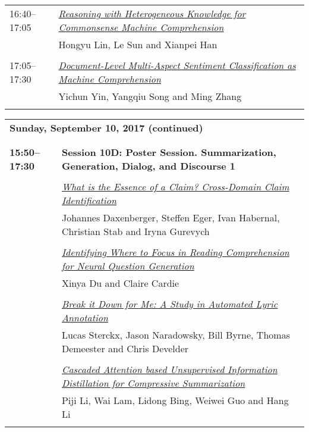 \begin{tabular}{p{20mm}p{128mm}}
16:40--17:05 & \hyperlink{page.2021}{\em Reasoning with Heterogeneous Knowledge for Commonsense Machine Comprehension}\\
         & Hongyu Lin, Le Sun and Xianpei Han \\
\\

17:05--17:30 & \hyperlink{page.2033}{\em Document-Level Multi-Aspect Sentiment Classification as Machine Comprehension}\\
         & Yichun Yin, Yangqiu Song and Ming Zhang \\
\\

\end{tabular}
\newpage
\begin{tabular}{p{20mm}p{128mm}}
\\
\multicolumn{2}{l}{\bf Sunday, September 10, 2017 (continued)} \\\\
\\{\bf 15:50--17:30} & {\bf Session 10D: Poster Session. Summarization, Generation, Dialog, and Discourse 1 } \\
\\
 & \hyperlink{page.2044}{\em What is the Essence of a Claim? Cross-Domain Claim Identification}\\
         & Johannes Daxenberger, Steffen Eger, Ivan Habernal, Christian Stab and Iryna Gurevych \\
\\

 & \hyperlink{page.2056}{\em Identifying Where to Focus in Reading Comprehension for Neural Question Generation}\\
         & Xinya Du and Claire Cardie \\
\\

 & \hyperlink{page.2063}{\em Break it Down for Me: A Study in Automated Lyric Annotation}\\
         & Lucas Sterckx, Jason Naradowsky, Bill Byrne, Thomas Demeester and Chris Develder \\
\\

 & \hyperlink{page.2070}{\em Cascaded Attention based Unsupervised Information Distillation for Compressive Summarization}\\
         & Piji Li, Wai Lam, Lidong Bing, Weiwei Guo and Hang Li \\
\\


\end{tabular}
